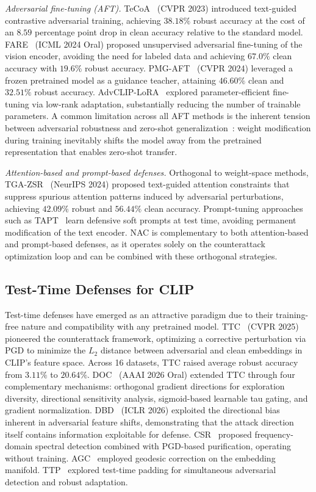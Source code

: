 \documentclass[pdflatex,sn-basic,Numbered]{sn-jnl}
\theoremstyle{thmstyleone}
\theoremstyle{thmstyletwo}
\theoremstyle{thmstylethree}
\begin{document}
\emph{Adversarial fine-tuning (AFT).} TeCoA~\cite{mao2023understanding} (CVPR 2023) introduced text-guided contrastive adversarial training, achieving $38.18\%$ robust accuracy at the cost of an $8.59$ percentage point drop in clean accuracy relative to the standard model. FARE~\cite{schlarmann2024robust} (ICML 2024 Oral) proposed unsupervised adversarial fine-tuning of the vision encoder, avoiding the need for labeled data and achieving $67.0\%$ clean accuracy with $19.6\%$ robust accuracy. PMG-AFT~\cite{xu2024pretrained} (CVPR 2024) leveraged a frozen pretrained model as a guidance teacher, attaining $46.60\%$ clean and $32.51\%$ robust accuracy. AdvCLIP-LoRA~\cite{chen2025advclip} explored parameter-efficient fine-tuning via low-rank adaptation, substantially reducing the number of trainable parameters. A common limitation across all AFT methods is the inherent tension between adversarial robustness and zero-shot generalization~\cite{gowal2021improving}: weight modification during training inevitably shifts the model away from the pretrained representation that enables zero-shot transfer.

\emph{Attention-based and prompt-based defenses.} Orthogonal to weight-space methods, TGA-ZSR~\cite{yu2024text} (NeurIPS 2024) proposed text-guided attention constraints that suppress spurious attention patterns induced by adversarial perturbations, achieving $42.09\%$ robust and $56.44\%$ clean accuracy. Prompt-tuning approaches such as TAPT~\cite{wang2025tapt} learn defensive soft prompts at test time, avoiding permanent modification of the text encoder. NAC is complementary to both attention-based and prompt-based defenses, as it operates solely on the counterattack optimization loop and can be combined with these orthogonal strategies.

\subsection{Test-Time Defenses for CLIP}

Test-time defenses have emerged as an attractive paradigm due to their training-free nature and compatibility with any pretrained model. TTC~\cite{xing2025clip} (CVPR 2025) pioneered the counterattack framework, optimizing a corrective perturbation via PGD to minimize the $L_2$ distance between adversarial and clean embeddings in CLIP's feature space. Across 16 datasets, TTC raised average robust accuracy from $3.11\%$ to $20.64\%$. DOC~\cite{jiang2026diversifying} (AAAI 2026 Oral) extended TTC through four complementary mechanisms: orthogonal gradient directions for exploration diversity, directional sensitivity analysis, sigmoid-based learnable tau gating, and gradient normalization. DBD~\cite{liu2026directional} (ICLR 2026) exploited the directional bias inherent in adversarial feature shifts, demonstrating that the attack direction itself contains information exploitable for defense. CSR~\cite{nie2025contrastive} proposed frequency-domain spectral detection combined with PGD-based purification, operating without training. AGC~\cite{li2026agc} employed geodesic correction on the embedding manifold. TTP~\cite{li2026ttp} explored test-time padding for simultaneous adversarial detection and robust adaptation.
\end{document}
